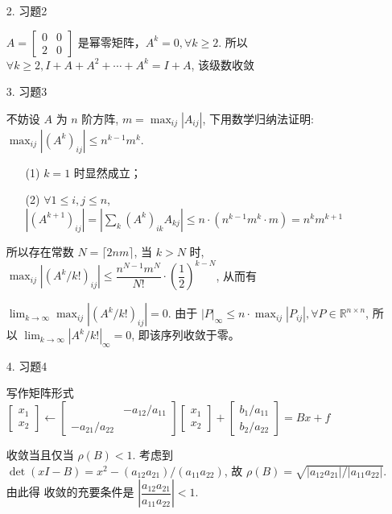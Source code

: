 \documentclass{article}
\begin{document}
\begin{spacing}{1.5}
\begin{itemize}
\begin{itemize}
    \end{itemize}

    \item [2.] 习题2
    
    $A=\left[\begin{array}{cc}0&0\\2&0\end{array}\right]$ 是幂零矩阵，$A^k=0, \forall k\geq 2$. 所以 $\forall k\geq 2, I + A + A^2 + \cdots + A^k = I + A$, 该级数收敛

    \item [3.] 习题3
    
    不妨设 $A$ 为 $n$ 阶方阵, $m = \max_{ij} |A_{ij}|$, 下用数学归纳法证明: $\max_{ij} |(A^k)_{ij}| \leq n^{k-1}m^k$.
    \begin{itemize}
        \item [(1)] $k=1$ 时显然成立；
        \item [(2)] $\forall 1\leq i,j\leq n$, $|(A^{k+1})_{ij}| = |\sum_k (A^k)_{ik}A_{kj}| \leq n \cdot (n^{k-1}m^k \cdot m) = n^km^{k+1}$
    \end{itemize}

    所以存在常数 $N = \lceil 2nm \rceil$, 当 $k > N$ 时, $\max_{ij} |(A^{k}/k!)_{ij}| \leq \dfrac{n^{N-1}m^N}{N!}\cdot \left(\dfrac{1}{2}\right)^{k-N}$, 从而有 
    
    $\lim_{k\to\infty} \max_{ij} |(A^k/k!)_{ij}| = 0$.
    由于 $|P|_\infty \leq n\cdot \max_{ij} |P_{ij}|, \forall P\in\mathbb{R}^{n\times n}$, 所以 $\lim_{k\to\infty} |A^k/k!|_\infty = 0$, 即该序列收敛于零。

    \item [4.] 习题4
    
    写作矩阵形式 $\left[\begin{array}{c}x_1\\x_2\end{array}\right]\leftarrow 
    \left[\begin{array}{cc}
         & -a_{12}/a_{11}\\
        -a_{21}/a_{22} &  
    \end{array}\right]
    \left[\begin{array}{c}x_1\\x_2\end{array}\right]
    +\left[\begin{array}{c}b_1/a_{11}\\b_2/a_{22}\end{array}\right] = Bx + f$

    收敛当且仅当 $\rho(B) < 1$. 考虑到 $\det (xI - B) = x^2 - (a_{12}a_{21}) / (a_{11}a_{22})$, 故 $\rho(B) = \sqrt{|a_{12}a_{21}|/|a_{11}a_{22}|}$. 由此得 收敛的充要条件是 $\left|\dfrac{a_{12}a_{21}}{a_{11}a_{22}}\right| < 1$.


\end{itemize}
\end{spacing}
\end{document}
